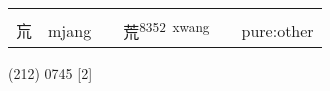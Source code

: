\documentclass[14pt,a4paper]{scrartcl}
\begin{document}
\begin{longtable}[c]{@{}llllll@{}}
\begin{minipage}[t]{0.14\columnwidth}
\strut\end{minipage}\tabularnewline
\begin{minipage}[t]{0.14\columnwidth}\raggedright\strut
巟
\strut\end{minipage} &
\begin{minipage}[t]{0.14\columnwidth}\raggedright\strut
mjang
\strut\end{minipage} &
\begin{minipage}[t]{0.14\columnwidth}\raggedright\strut
\strut\end{minipage} &
\begin{minipage}[t]{0.14\columnwidth}\raggedright\strut
荒\textsuperscript{8352~xwang}
\strut\end{minipage} &
\begin{minipage}[t]{0.14\columnwidth}\raggedright\strut
\strut\end{minipage} &
\begin{minipage}[t]{0.14\columnwidth}\raggedright\strut
pure:other
\strut\end{minipage}\tabularnewline
\bottomrule
\end{longtable}

(212) 0745 {[}2{]}
\end{document}
